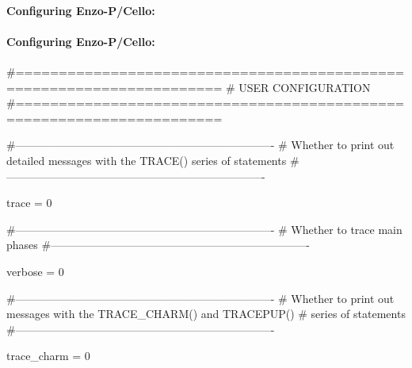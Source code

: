 \begin{frame}[fragile] 
\secframetitle{\ssConfigure}
\framesubtitle{Configuring Enzo-P/Cello: }
\tiny
\begin{semiverbatim}
\end{semiverbatim}
\end{frame}

\begin{frame}[fragile] 
\secframetitle{\ssConfigure}
\framesubtitle{Configuring Enzo-P/Cello: }
\tiny
\begin{semiverbatim}

#======================================================================
# USER CONFIGURATION
#======================================================================

#----------------------------------------------------------------------
# Whether to print out detailed messages with the TRACE() series of statements
#----------------------------------------------------------------------

trace = 0

#----------------------------------------------------------------------
# Whether to trace main phases
#----------------------------------------------------------------------

verbose = 0

#----------------------------------------------------------------------
# Whether to print out messages with the TRACE_CHARM() and TRACEPUP()
#  series of statements
#----------------------------------------------------------------------

trace_charm = 0

\end{semiverbatim}
\end{frame}

